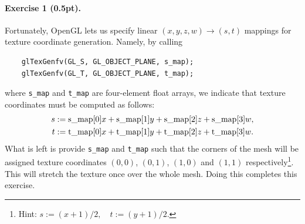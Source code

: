 \documentclass{article}
\newenvironment{exercise}[2]{\paragraph{Exercise #1 (#2pt).} }{
\medskip}
\begin{document}
\begin{exercise}{1}{0.5}
\begin{enumerate}
Fortunately, OpenGL lets us specify linear $(x,y,z,w) \to (s,t)$ mappings for texture coordinate generation. Namely, by calling
\begin{verbatim}
    glTexGenfv(GL_S, GL_OBJECT_PLANE, s_map);
    glTexGenfv(GL_T, GL_OBJECT_PLANE, t_map);
\end{verbatim}
where \verb#s_map# and \verb#t_map# are four-element float arrays, we indicate that texture coordinates must be computed as follows:
\begin{align*}
s &:= \text{s\textunderscore map[0]}x + \text{s\textunderscore map[1]}y + \text{s\textunderscore map[2]}z + \text{s\textunderscore map[3]}w,\\
t &:= \text{t\textunderscore map[0]}x + \text{t\textunderscore map[1]}y + \text{t\textunderscore map[2]}z + \text{t\textunderscore map[3]}w.
\end{align*}
What is left is provide \verb#s_map# and \verb#t_map# such that the corners of the mesh will be assigned texture coordinates $(0, 0)$, $(0, 1)$, $(1, 0)$ and $(1, 1)$ respectively\footnote{Hint: $s := (x+1)/2,\quad t := (y+1)/2$.}. This will stretch the texture once over the whole mesh. Doing this completes this exercise.
\end{enumerate}
\end{exercise}
\end{document}
